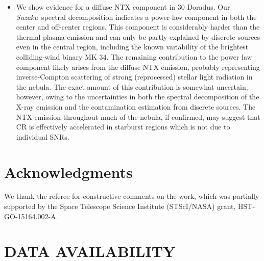 \documentclass[usenatbib]{mnras}
\def\xs{30 Doradus}
\def\suzaku{{\sl Suzaku}}
\begin{document}
\begin{itemize}
\item We show evidence for a diffuse NTX component in \xs. Our \suzaku\ spectral decomposition indicates a power-law component in both the center and off-center regions. This component is considerably harder than the thermal plasma emission and can only be partly explained by discrete sources even in the central region, including the known variability of the brightest colliding-wind binary MK 34. The remaining contribution to the power law component likely arises from the diffuse NTX emission, probably representing inverse-Compton scattering of strong (reprocessed) stellar light radiation in the nebula. The exact amount of this contribution is somewhat uncertain, however, owing to the uncertainties in both the spectral decomposition of the X-ray emission and the contamination estimation from discrete sources. The NTX emission throughout much of the nebula, if confirmed, may suggest that CR is effectively accelerated in starburst regions which is not due to individual SNRs. 

\end{itemize}

\section*{Acknowledgments}

We thank the referee for constructive comments on the work, which was partially supported by the Space Telescope Science Institute (STScI/NASA) grant, HST-GO-15164.002-A.

\section*{DATA  AVAILABILITY}
\end{document}
